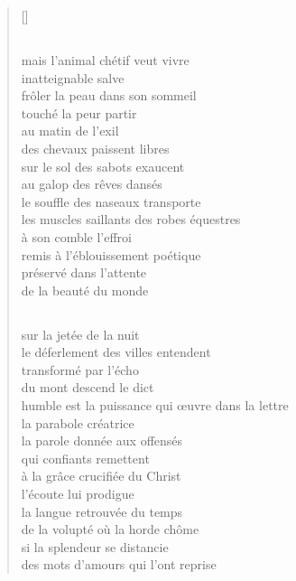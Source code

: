 \documentclass[a4paper, titlepage, twoside, 12pt]{book}
\begin{document}
\begin{verse}[\versewidth]
\subsection*{}
mais l'animal chétif veut vivre\\
inatteignable salve\\
frôler la peau dans son sommeil\\
touché la peur partir\\
au matin de l'exil\\
des chevaux paissent libres\\
sur le sol des sabots exaucent\\
au galop des rêves dansés\\ 
le souffle  des naseaux transporte\\
les muscles saillants des robes équestres\\
à son comble l'effroi\\
remis à l'éblouissement poétique\\ 
préservé dans l'attente\\
de la beauté du monde

\subsection*{}
sur la jetée de la nuit\\
le déferlement des villes entendent\\
transformé par l'écho\\
du mont descend le dict\\
humble est la puissance qui \oe uvre dans la lettre\\
la parabole créatrice\\
la parole donnée aux offensés\\
qui confiants remettent\\
à la grâce crucifiée du Christ\\
l'écoute lui prodigue\\
la langue retrouvée du temps\\
de la volupté où la horde chôme\\
si la splendeur se distancie\\
des mots d'amours qui l'ont reprise


\end{verse}
\end{document}
